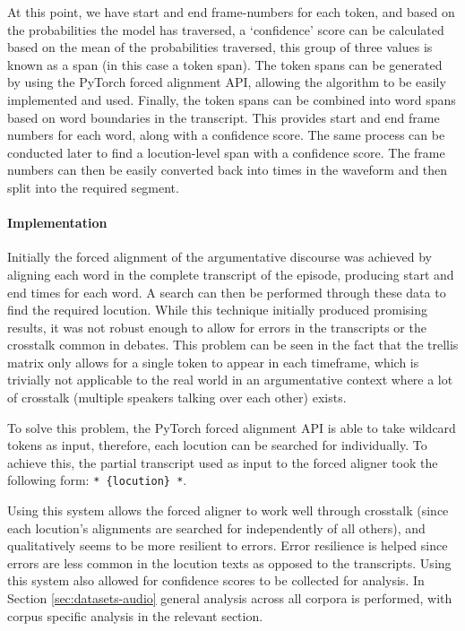 \documentclass[twocolumn,twoside]{article}
\begin{document}
At this point, we have start and end frame-numbers for each token, and
based on the probabilities the model has traversed, a `confidence' score
can be calculated based on the mean of the probabilities traversed, this
group of three values is known as a span (in this case a token span).
The token spans can be generated by using the PyTorch forced alignment
API, allowing the algorithm to be easily implemented and used. Finally,
the token spans can be combined into word spans based on word boundaries
in the transcript. This provides start and end frame numbers for each
word, along with a confidence score. The same process can be conducted
later to find a locution-level span with a confidence score. The frame
numbers can then be easily converted back into times in the waveform and
then split into the required segment.

\paragraph{Implementation}\label{implementation}

Initially the forced alignment of the argumentative discourse was
achieved by aligning each word in the complete transcript of the
episode, producing start and end times for each word. A search can then
be performed through these data to find the required locution. While
this technique initially produced promising results, it was not robust
enough to allow for errors in the transcripts or the crosstalk common in
debates. This problem can be seen in the fact that the trellis matrix
only allows for a single token to appear in each timeframe, which is
trivially not applicable to the real world in an argumentative context
where a lot of crosstalk (multiple speakers talking over each other)
exists.

To solve this problem, the PyTorch forced alignment API is able to take
wildcard tokens as input, therefore, each locution can be searched for
individually. To achieve this, the partial transcript used as input to
the forced aligner took the following form: \texttt{*\ \{locution\}\ *}.

Using this system allows the forced aligner to work well through
crosstalk (since each locution's alignments are searched for
independently of all others), and qualitatively seems to be more
resilient to errors. Error resilience is helped since errors are less
common in the locution texts as opposed to the transcripts. Using this
system also allowed for confidence scores to be collected for analysis.
In Section \ref{sec:datasets-audio} general analysis across all corpora
is performed, with corpus specific analysis in the relevant section.
\end{document}
